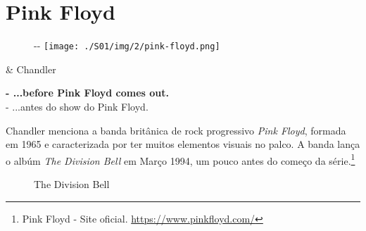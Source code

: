 \hypertarget{pink-floyd}{%
\section{Pink Floyd}\label{pink-floyd}}

\begin{figure}[!ht]
  \begin{adjustwidth}{-\oddsidemargin-1in}{-\rightmargin}
    \centering
    \texttt{[image: ./S01/img/2/pink-floyd.png]}
  \end{adjustwidth}
\end{figure}

\begin{tcolorbox}[enhanced,center upper,
    drop fuzzy shadow southeast, boxrule=0.3pt,
    lower separated=false, breakable,
    colframe=black!30!dialogoBorder,colback=white]
\begin{minipage}[c]{0.16\linewidth}
   & \centering \scriptsize{Chandler}
\end{minipage}
\hfill
\begin{minipage}[c]{0.8\linewidth}
  \textbf{- ...before Pink Floyd comes out.}\\
  - ...antes do show do Pink Floyd.
\end{minipage}
\end{tcolorbox}

\saveparinfos
\noindent
\begin{minipage}[c]{0.5\textwidth}\useparinfo

Chandler menciona a banda britânica de rock progressivo \emph{Pink
Floyd}, formada em 1965 e caracterizada por ter muitos elementos visuais
no palco. A banda lança o albúm \emph{The Division Bell} em Março 1994,
um pouco antes do começo da série.\footnote{\sloppy Pink Floyd - Site oficial. \url{https://www.pinkfloyd.com/}}

\end{minipage}\hfill
\begin{minipage}[c]{0.5\textwidth}

\begin{figure}
  \centering
    \caption{The Division Bell\label{fig:the-division-bell}}
\end{figure}

\end{minipage}

